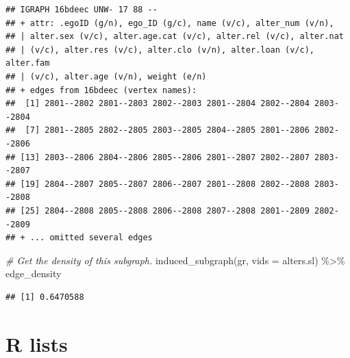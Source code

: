 \documentclass[
]{book}
\newenvironment{Shaded}{\begin{snugshade}}{\end{snugshade}}
\newcommand{\AttributeTok}[1]{\textcolor[rgb]{0.77,0.63,0.00}{#1}}
\newcommand{\CommentTok}[1]{\textcolor[rgb]{0.56,0.35,0.01}{\textit{#1}}}
\newcommand{\FunctionTok}[1]{\textcolor[rgb]{0.00,0.00,0.00}{#1}}
\newcommand{\NormalTok}[1]{#1}
\newcommand{\SpecialCharTok}[1]{\textcolor[rgb]{0.00,0.00,0.00}{#1}}
\begin{document}
\begin{verbatim}
## IGRAPH 16bdeec UNW- 17 88 -- 
## + attr: .egoID (g/n), ego_ID (g/c), name (v/c), alter_num (v/n),
## | alter.sex (v/c), alter.age.cat (v/c), alter.rel (v/c), alter.nat
## | (v/c), alter.res (v/c), alter.clo (v/n), alter.loan (v/c), alter.fam
## | (v/c), alter.age (v/n), weight (e/n)
## + edges from 16bdeec (vertex names):
##  [1] 2801--2802 2801--2803 2802--2803 2801--2804 2802--2804 2803--2804
##  [7] 2801--2805 2802--2805 2803--2805 2804--2805 2801--2806 2802--2806
## [13] 2803--2806 2804--2806 2805--2806 2801--2807 2802--2807 2803--2807
## [19] 2804--2807 2805--2807 2806--2807 2801--2808 2802--2808 2803--2808
## [25] 2804--2808 2805--2808 2806--2808 2807--2808 2801--2809 2802--2809
## + ... omitted several edges
\end{verbatim}

\begin{Shaded}
\begin{Highlighting}[]
\CommentTok{\# Get the density of this subgraph.}
\FunctionTok{induced\_subgraph}\NormalTok{(gr, }\AttributeTok{vids =}\NormalTok{ alters.sl) }\SpecialCharTok{\%\textgreater{}\%} 
\NormalTok{  edge\_density}
\end{Highlighting}
\end{Shaded}

\begin{verbatim}
## [1] 0.6470588
\end{verbatim}

\hypertarget{lists}{%
\section{R lists}\label{lists}}
\end{document}

